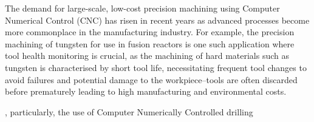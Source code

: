 \documentclass[../main.tex]{subfiles}
\begin{document}





The demand for large-scale, low-cost precision machining using Computer Numerical Control (CNC) has risen in recent years as advanced processes become more commonplace in the manufacturing industry. For example, the precision machining of tungsten for use in fusion reactors is one such application where tool health monitoring is crucial, as the machining of hard materials such as tungsten is characterised by short tool life, necessitating frequent tool changes to avoid failures and potential damage to the workpiece--tools are often discarded before prematurely leading to high manufacturing and environmental costs.

, particularly, the use of Computer Numerically Controlled drilling 
\end{document}
